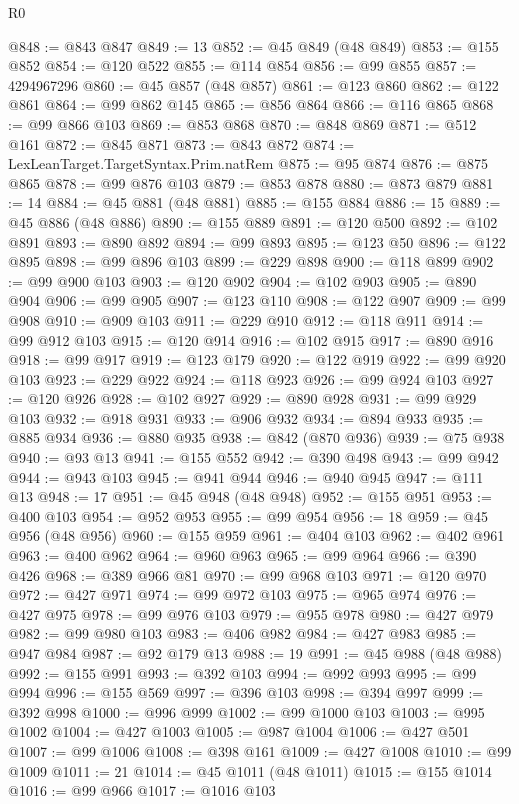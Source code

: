 \begin{lexlean}{R0}
\begin{coremodule}
@848 := @843 @847
@849 := 13
@852 := @45 @849 (@48 @849)
@853 := @155 @852
@854 := @120 @522
@855 := @114 @854
@856 := @99 @855
@857 := 4294967296
@860 := @45 @857 (@48 @857)
@861 := @123 @860
@862 := @122 @861
@864 := @99 @862 @145
@865 := @856 @864
@866 := @116 @865
@868 := @99 @866 @103
@869 := @853 @868
@870 := @848 @869
@871 := @512 @161
@872 := @845 @871
@873 := @843 @872
@874 := LexLeanTarget.TargetSyntax.Prim.natRem
@875 := @95 @874
@876 := @875 @865
@878 := @99 @876 @103
@879 := @853 @878
@880 := @873 @879
@881 := 14
@884 := @45 @881 (@48 @881)
@885 := @155 @884
@886 := 15
@889 := @45 @886 (@48 @886)
@890 := @155 @889
@891 := @120 @500
@892 := @102 @891
@893 := @890 @892
@894 := @99 @893
@895 := @123 @50
@896 := @122 @895
@898 := @99 @896 @103
@899 := @229 @898
@900 := @118 @899
@902 := @99 @900 @103
@903 := @120 @902
@904 := @102 @903
@905 := @890 @904
@906 := @99 @905
@907 := @123 @110
@908 := @122 @907
@909 := @99 @908
@910 := @909 @103
@911 := @229 @910
@912 := @118 @911
@914 := @99 @912 @103
@915 := @120 @914
@916 := @102 @915
@917 := @890 @916
@918 := @99 @917
@919 := @123 @179
@920 := @122 @919
@922 := @99 @920 @103
@923 := @229 @922
@924 := @118 @923
@926 := @99 @924 @103
@927 := @120 @926
@928 := @102 @927
@929 := @890 @928
@931 := @99 @929 @103
@932 := @918 @931
@933 := @906 @932
@934 := @894 @933
@935 := @885 @934
@936 := @880 @935
@938 := @842 (@870 @936)
@939 := @75 @938
@940 := @93 @13
@941 := @155 @552
@942 := @390 @498
@943 := @99 @942
@944 := @943 @103
@945 := @941 @944
@946 := @940 @945
@947 := @111 @13
@948 := 17
@951 := @45 @948 (@48 @948)
@952 := @155 @951
@953 := @400 @103
@954 := @952 @953
@955 := @99 @954
@956 := 18
@959 := @45 @956 (@48 @956)
@960 := @155 @959
@961 := @404 @103
@962 := @402 @961
@963 := @400 @962
@964 := @960 @963
@965 := @99 @964
@966 := @390 @426
@968 := @389 @966 @81
@970 := @99 @968 @103
@971 := @120 @970
@972 := @427 @971
@974 := @99 @972 @103
@975 := @965 @974
@976 := @427 @975
@978 := @99 @976 @103
@979 := @955 @978
@980 := @427 @979
@982 := @99 @980 @103
@983 := @406 @982
@984 := @427 @983
@985 := @947 @984
@987 := @92 @179 @13
@988 := 19
@991 := @45 @988 (@48 @988)
@992 := @155 @991
@993 := @392 @103
@994 := @992 @993
@995 := @99 @994
@996 := @155 @569
@997 := @396 @103
@998 := @394 @997
@999 := @392 @998
@1000 := @996 @999
@1002 := @99 @1000 @103
@1003 := @995 @1002
@1004 := @427 @1003
@1005 := @987 @1004
@1006 := @427 @501
@1007 := @99 @1006
@1008 := @398 @161
@1009 := @427 @1008
@1010 := @99 @1009
@1011 := 21
@1014 := @45 @1011 (@48 @1011)
@1015 := @155 @1014
@1016 := @99 @966
@1017 := @1016 @103

\end{coremodule}
\end{lexlean}

